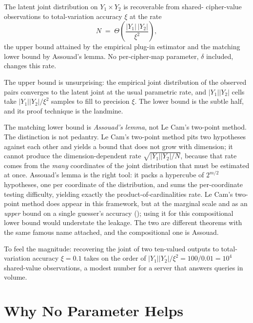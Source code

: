 \begin{theorem}
\label{thm:joint-recovery}
The latent joint distribution on $Y_1 \times Y_2$ is recoverable from shared-%
cipher-value observations to total-variation accuracy $\xi$ at the rate
\[
  N \;=\; \Theta\!\left(\frac{\lvert Y_1\rvert\,\lvert Y_2\rvert}{\xi^{2}}\right),
\]
the upper bound attained by the empirical plug-in estimator and the matching
lower bound by Assouad's lemma. No per-cipher-map parameter, $\delta$
included, changes this rate.
\end{theorem}

The upper bound is unsurprising: the empirical joint distribution of the
observed pairs converges to the latent joint at the usual parametric rate,
and $\lvert Y_1\rvert\lvert Y_2\rvert$ cells take $\lvert Y_1\rvert\lvert
Y_2\rvert/\xi^2$ samples to fill to precision $\xi$. The lower bound is the
subtle half, and its proof technique is the landmine.

\begin{remark}
\label{rem:assouad-not-lecam}
The matching lower bound is \emph{Assouad's lemma}, not Le Cam's two-point
method. The distinction is not pedantry. Le Cam's two-point method pits two
hypotheses against each other and yields a bound that does not grow with
dimension; it cannot produce the dimension-dependent rate
$\sqrt{\lvert Y_1\rvert\lvert Y_2\rvert / N}$, because that rate comes from
the \emph{many} coordinates of the joint distribution that must be estimated
at once. Assouad's lemma is the right tool: it packs a hypercube of
$2^{m/2}$ hypotheses, one per coordinate of the distribution, and sums the
per-coordinate testing difficulty, yielding exactly the product-of-cardinalities
rate. Le Cam's two-point method does appear in this framework, but at the
marginal scale and as an \emph{upper} bound on a single guesser's accuracy
(); using it for this compositional lower bound
would understate the leakage. The two are different theorems with the same
famous name attached, and the compositional one is Assouad.
\end{remark}

To feel the magnitude: recovering the joint of two ten-valued outputs to
total-variation accuracy $\xi = 0.1$ takes on the order of $\lvert
Y_1\rvert\lvert Y_2\rvert/\xi^2 = 100/0.01 = 10^4$ shared-value observations,
a modest number for a server that answers queries in volume.

\section{Why No Parameter Helps}
\label{sec:irreducibility}

